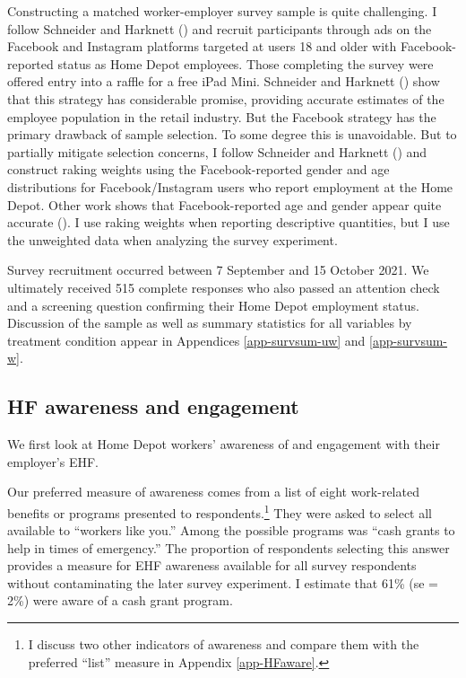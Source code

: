 \documentclass[
  11pt,
  oneside]{article}
\begin{document}
Constructing a matched worker-employer survey sample is quite challenging. I follow Schneider and Harknett () and recruit participants through ads on the Facebook and Instagram platforms targeted at users 18 and older with Facebook-reported status as Home Depot employees. Those completing the survey were offered entry into a raffle for a free iPad Mini. Schneider and Harknett () show that this strategy has considerable promise, providing accurate estimates of the employee population in the retail industry. But the Facebook strategy has the primary drawback of sample selection. To some degree this is unavoidable. But to partially mitigate selection concerns, I follow Schneider and Harknett () and construct raking weights using the Facebook-reported gender and age distributions for Facebook/Instagram users who report employment at the Home Depot. Other work shows that Facebook-reported age and gender appear quite accurate (). I use raking weights when reporting descriptive quantities, but I use the unweighted data when analyzing the survey experiment.

Survey recruitment occurred between 7 September and 15 October 2021. We ultimately received 515 complete responses who also passed an attention check and a screening question confirming their Home Depot employment status. Discussion of the sample as well as summary statistics for all variables by treatment condition appear in Appendices \ref{app-survsum-uw} and \ref{app-survsum-w}.

\subsection{HF awareness and engagement}\label{hf-awareness-and-engagement}

We first look at Home Depot workers' awareness of and engagement with their employer's EHF.

Our preferred measure of awareness comes from a list of eight work-related benefits or programs presented to respondents.\footnote{I discuss two other indicators of awareness and compare them with the preferred ``list'' measure in Appendix \ref{app-HFaware}.} They were asked to select all available to ``workers like you.'' Among the possible programs was ``cash grants to help in times of emergency.'' The proportion of respondents selecting this answer provides a measure for EHF awareness available for all survey respondents without contaminating the later survey experiment. I estimate that 61\% (se = 2\%) were aware of a cash grant program.
\end{document}
